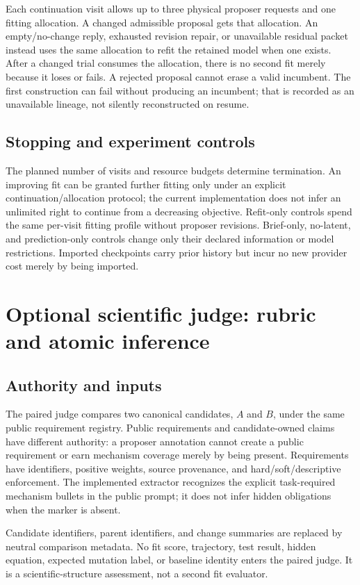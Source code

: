 \documentclass[11pt]{article}
\begin{document}
Each continuation visit allows up to three physical proposer requests and one
fitting allocation. A changed admissible proposal gets that allocation. An
empty/no-change reply, exhausted revision repair, or unavailable residual packet
instead uses the same allocation to refit the retained model when one exists.
After a changed trial consumes the allocation, there is no second fit merely
because it loses or fails. A rejected proposal cannot erase a valid incumbent.
The first construction can fail without producing an incumbent; that is recorded
as an unavailable lineage, not silently reconstructed on resume.

\subsection{Stopping and experiment controls}
The planned number of visits and resource budgets determine termination.
An improving fit can be granted further fitting only under an explicit
continuation/allocation protocol; the current implementation does not infer an
unlimited right to continue from a decreasing objective. Refit-only controls
spend the same per-visit fitting profile without proposer revisions. Brief-only,
no-latent, and prediction-only controls change only their declared information
or model restrictions. Imported checkpoints carry prior history but incur no
new provider cost merely by being imported.

\section{Optional scientific judge: rubric and atomic inference}
\label{sec:judge}

\subsection{Authority and inputs}
The paired judge compares two canonical candidates, $A$ and $B$, under the same
public requirement registry. Public requirements and candidate-owned claims have
different authority: a proposer annotation cannot create a public requirement or
earn mechanism coverage merely by being present. Requirements have identifiers,
positive weights, source provenance, and hard/soft/descriptive enforcement.
The implemented extractor recognizes the explicit task-required mechanism bullets
in the public prompt; it does not infer hidden obligations when the marker is absent.

Candidate identifiers, parent identifiers, and change summaries are replaced by
neutral comparison metadata. No fit score, trajectory, test result, hidden
equation, expected mutation label, or baseline identity enters the paired judge.
It is a scientific-structure assessment, not a second fit evaluator.
\end{document}

